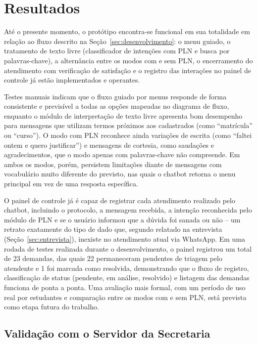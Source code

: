 \documentclass[12pt]{article}
\begin{document}
\section{Resultados}\label{sec:resultados}

Até o presente momento, o protótipo encontra-se funcional em sua
totalidade em relação ao fluxo descrito na Seção~\ref{sec:desenvolvimento}: o menu guiado, o tratamento de texto livre (classificador de intenções com PLN e busca por palavras-chave), a alternância entre os modos com e sem PLN, o encerramento do atendimento com verificação de
satisfação e o registro das interações no painel de controle já estão
implementados e operantes.

Testes manuais indicam que o fluxo guiado por menus responde de forma
consistente e previsível a todas as opções mapeadas no diagrama de fluxo,
enquanto o módulo de interpretação de texto livre apresenta bom desempenho para mensagens que utilizam termos próximos aos cadastrados (como ``matrícula'' ou ``curso''). O modo com PLN reconhece ainda variações de escrita (como ``faltei ontem e quero justificar'') e mensagens de cortesia, como saudações e agradecimentos, que o modo apenas com palavras-chave não compreende. Em ambos os modos, porém, persistem limitações diante de mensagens com vocabulário muito diferente do previsto, nas quais o chatbot retorna o menu principal em vez de uma resposta específica.

O painel de controle já é capaz de registrar cada atendimento realizado
pelo chatbot, incluindo o protocolo, a mensagem recebida, a intenção reconhecida pelo módulo de PLN e se o usuário informou que a dúvida foi sanada ou não -- um retrato exatamente do tipo de dado que, segundo
relatado na entrevista (Seção~\ref{sec:entrevista}), inexiste no atendimento atual via
WhatsApp. Em uma rodada de testes realizada durante o desenvolvimento, o
painel registrou um total de 23 demandas, das quais 22 permaneceram
pendentes de triagem pelo atendente e 1 foi marcada como resolvida,
demonstrando que o fluxo de registro, classificação de status (pendente,
em análise, resolvido) e listagem das demandas funciona de ponta a ponta.
Uma avaliação mais formal, com um período de uso real por estudantes e
comparação entre os modos com e sem PLN, está prevista como etapa futura
do trabalho.

\subsection{Validação com o Servidor da Secretaria}
\end{document}

